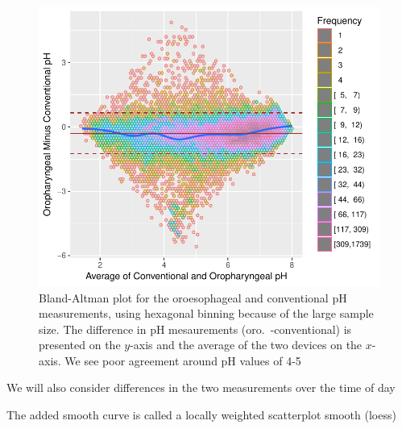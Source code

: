 \begin{Schunk}
\begin{figure}[htbp]

\centerline{\includegraphics{corr-baplot-1} }

\caption[Bland-Altman plot for 2 pH measurements]{Bland-Altman plot for the oroesophageal and conventional pH measurements, using hexagonal binning because of the large sample size.  The difference in pH mesaurements (oro.\ -conventional) is presented on the $y$-axis and the average of the two devices on the $x$-axis.  We see poor agreement around pH values of 4-5}\label{fig:corr-baplot}
\end{figure}
\end{Schunk}

\bi 
  \item We will also consider differences in the two measurements over the time of day
  \item The added smooth curve is called a locally weighted scatterplot smooth (loess)
\ei

